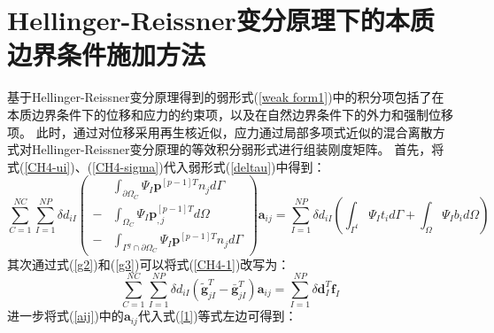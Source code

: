 \section{Hellinger-Reissner变分原理下的本质边界条件施加方法}
基于Hellinger-Reissner变分原理得到的弱形式(\ref{weak form1})中的积分项包括了在本质边界条件下的位移和应力的约束项，以及在自然边界条件下的外力和强制位移项。
此时，通过对位移采用再生核近似，应力通过局部多项式近似的混合离散方式对Hellinger-Reissner变分原理的等效积分弱形式进行组装刚度矩阵。
首先，将式(\ref{CH4-ui})、(\ref{CH4-sigma})代入弱形式(\ref{deltau})中得到：
\begin{equation}\label{CH4-1}
\sum_{C=1}^{N\!C}\sum_{I=1}^{N\!P}\delta d_{iI} \left (
        \begin{split}
        &\int_{\partial\Omega_C}\Psi_I\pmb{p}^{[p-1]T}n_jd\Gamma \\
        -&\int_{\Omega_C}\Psi_I\pmb{p}_{,j}^{[p-1]T}d\Omega \\
        -&\int_{\Gamma^g\cap\partial\Omega_C}\Psi_I\pmb{p}^{[p-1]T}n_jd\Gamma
        \end{split}
        \right )\pmb{a}_{ij}=
\sum_{I=1}^{N\!P}\delta d_{iI}(\int_{\Gamma^t}\Psi_It_id\Gamma+\int_{\Omega}\Psi_Ib_id\Omega)
\end{equation}
其次通过式(\ref{g2})和(\ref{g3})可以将式(\ref{CH4-1})改写为：
\begin{equation}\label{1}
    \sum_{C=1}^{N\!C}\sum_{I=1}^{N\!P}\delta d_{iI}(\tilde{\pmb g}_{jI}^T-\bar{\pmb g}_{jI}^T)\pmb{a}_{ij}=\sum_{I=1}^{N\!P}\delta\pmb{d}_I^T\pmb{f}_I
\end{equation}
进一步将式(\ref{aij})中的$\pmb{a}_{ij}$代入式(\ref{1})等式左边可得到：
